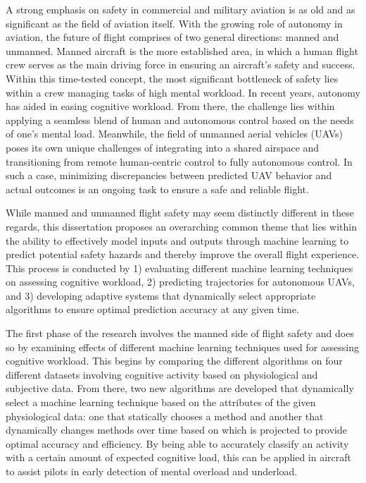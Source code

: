 \documentclass[12pt]{uthesis-v12}  %
\begin{document}

\begin{abstractpage}
A strong emphasis on safety in commercial and military aviation is as old and as significant as the field of aviation itself. With the growing role of autonomy in aviation, the future of flight comprises of two general directions: manned and unmanned. Manned aircraft is the more established area, in which a human flight crew serves as the main driving force in ensuring an aircraft’s safety and success. Within this time-tested concept, the most significant bottleneck of safety lies within a crew managing tasks of high mental workload. In recent years, autonomy has aided in easing cognitive workload. From there, the challenge lies within applying a seamless blend of human and autonomous control based on the needs of one’s mental load. Meanwhile, the field of unmanned aerial vehicles (UAVs) poses its own unique challenges of integrating into a shared airspace and transitioning from remote human-centric control to fully autonomous control. In such a case, minimizing discrepancies between predicted UAV behavior and actual outcomes is an ongoing task to ensure a safe and reliable flight. 

While manned and unmanned flight safety may seem distinctly different in these regards, this dissertation proposes an overarching common theme that lies within the ability to effectively model inputs and outputs through machine learning to predict potential safety hazards and thereby improve the overall flight experience. This process is conducted by 1) evaluating different machine learning techniques on assessing cognitive workload, 2) predicting trajectories for autonomous UAVs, and 3) developing adaptive systems that dynamically select appropriate algorithms to ensure optimal prediction accuracy at any given time.

The first phase of the research involves the manned side of flight safety and does so by examining effects of different machine learning techniques used for assessing cognitive workload. This begins by comparing the different algorithms on four different datasets involving cognitive activity based on physiological and subjective data. From there, two new algorithms are developed that dynamically select a machine learning technique based on the attributes of the given physiological data: one that statically chooses a method and another that dynamically changes methods over time based on which is projected to provide optimal accuracy and efficiency. By being able to accurately classify an activity with a certain amount of expected cognitive load, this can be applied in aircraft to assist pilots in early detection of mental overload and underload.


\end{abstractpage}
\end{document}
